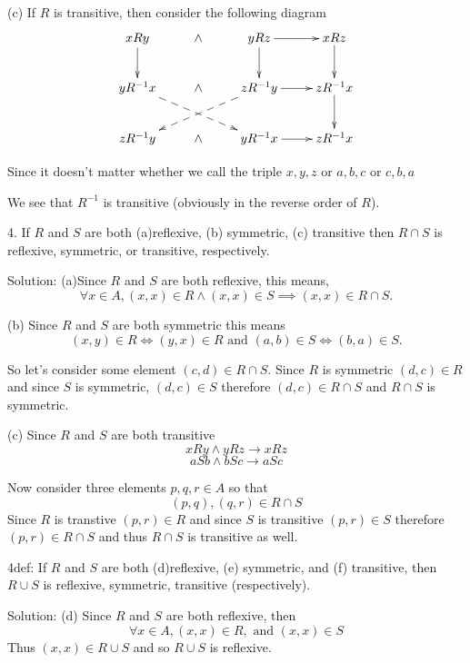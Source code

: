 \documentclass[16 pt]{amsart}
\theoremstyle{definition}
\theoremstyle{remark}
\numberwithin{equation}{section}
\begin{document}
\vspace{.5in}

(c) If $R$ is transitive, then consider the following diagram
\[
\xymatrix{
xRy \ar[d]& \wedge & yRz\ar[d] \ar[r] & xRz\ar[d]\\
yR^{-1}x \ar@{-->}[drr] & \wedge & zR^{-1}y\ar@{-->}[dll] \ar[r] & zR^{-1}x \ar[d]\\
zR^{-1}y & \wedge & yR^{-1}x \ar[r] & zR^{-1}x
}
\]

Since it doesn't matter whether we call the triple $x,y,z$ or $a,b,c$ or $c,b,a$

We see that $R^{-1}$ is transitive (obviously in the reverse order of $R$).

\newpage

4. If $R$ and $S$ are both (a)reflexive, (b) symmetric, (c) transitive then $R\cap S$ is reflexive, symmetric, or transitive, respectively.

\vspace{.5in}

Solution: (a)Since $R$ and $S$ are both reflexive, this means, 
\[
\forall x\in A, (x,x)\in R \wedge (x,x)\in S \implies (x,x)\in R\cap S.
\]

(b) Since $R$ and $S$ are both symmetric this means
\[
(x,y)\in R \iff (y,x)\in R \text{ and } (a,b)\in S \iff (b,a)\in S.
\]

So let's consider some element $(c,d)\in R\cap S$.
Since $R$ is symmetric $(d,c)\in R$ and since $S$ is symmetric, $(d,c)\in S$ therefore $(d,c)\in R\cap S$ and $R\cap S$ is symmetric.

\vspace{.5in}

(c) Since $R$ and $S$ are both transitive 
\[
xRy \wedge yRz \rightarrow xRz
\]
\[
aSb \wedge bSc \rightarrow aSc
\]

Now consider three elements $p,q,r\in A$ so that
\[
(p,q),(q,r) \in R\cap S
\]
Since $R$ is transtive $(p,r)\in R$ and since $S$ is transitive $(p,r)\in S$ therefore $(p,r)\in R\cap S$
and thus $R\cap S$ is transitive as well.



\newpage

4def: If $R$ and $S$ are both (d)reflexive, (e) symmetric, and (f) transitive, then $R\cup S$ is reflexive, symmetric, transitive (respectively).

\vspace{1in}

Solution: (d) Since $R$ and $S$ are both reflexive, then
\[
\forall x\in A, (x,x)\in R, \text{ and } (x,x)\in S
\]
Thus $(x,x)\in R\cup S$ and so $R\cup S$ is reflexive.
\end{document}
